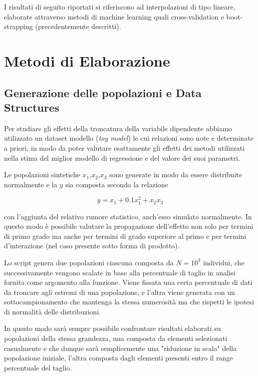 \documentclass[12pt,openright,twoside,a4paper]{book}
\begin{document}
I risultati di seguito riportati si riferiscono ad interpolazioni di tipo lineare, elaborate attraverso metodi di machine learning quali cross-validation e boot-strapping (precedentemente descritti).

\section{Metodi di Elaborazione}
\subsection {Generazione delle popolazioni e Data Structures}

Per studiare gli effetti della troncatura della variabile dipendente abbiamo utilizzato un dataset modello (\textit{toy model}) le cui relazioni sono note e determinate a priori, in modo da poter valutare esattamente gli effetti dei metodi utilizzati nella stima del miglior modello di regressione e del valore dei suoi parametri.

Le popolazioni sintetiche $x_1$,$x_2$,$x_3$ sono generate in modo da essere distribuite normalmente e la $y$ sia composta secondo la relazione

\begin{equation}
y=x_1+0.1x_1^2+x_2x_3
\end{equation}

con l'aggiunta del relativo rumore statistico, anch'esso simulato normalmente.
In questo modo è possibile valutare la propagazione dell'effetto non solo per termini di primo grado ma anche per  termini di grado superiore al primo e per termini d'interazione (nel caso presente sotto forma di prodotto).

Lo script genera due popolazioni ciascuna composta da $N=10^3$ individui, che successivamente vengono scalate in base alla percentuale di taglio in analisi fornita come argomento alla funzione. Viene fissata una certa percentuale di dati da troncare agli estremi di una popolazione, e l'altra viene generata con un sottocampionamento che mantenga la stessa numerosità ma che rispetti le ipotesi di normalità delle distribuzioni.

In questo modo sarà sempre possibile confrontare risultati elaborati su popolazioni della stessa grandezza, una composta da elementi selezionati casualmente e che dunque sarà semplicemente una "riduzione in scala" della popolazione iniziale, l'altra composta dagli elementi presenti entro il range percentuale del taglio.
\end{document}

